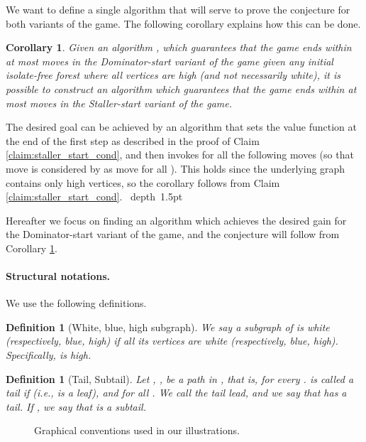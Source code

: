 \documentclass[11pt]{article}
\def\Proof{\par\noindent{\bf Proof:~}}
\def\blackslug{\hbox{\hskip 1pt \vrule width 4pt height 8pt
    depth 1.5pt \hskip 1pt}}
\def\QED{\quad\blackslug\lower 8.5pt\null\par}
\newtheorem{definition}[theorem]{Definition}
\newtheorem{corollary}[theorem]{Corollary}
\theoremstyle{definition}
\begin{document}
We want to define a single algorithm that will serve to prove the conjecture for both variants of the game.
The following corollary explains how this can be done.

\begin{corollary}
\label{cor:dom_stall_start}
Given an algorithm , which guarantees that the game ends within at most  moves in the Dominator-start variant of the game given any initial isolate-free forest where all vertices are high (and not necessarily white), it is possible to construct an algorithm  which guarantees that the game ends within at most  moves in the Staller-start variant of the game.
\end{corollary}
\Proof
The desired goal can be achieved by an algorithm  that sets the value function at the end of the first step as described in the proof of Claim \ref{claim:staller_start_cond}, and then invokes  for all the following moves (so that move  is considered by  as move  for all ).
This holds since the underlying graph  contains only high vertices, so the corollary follows from Claim \ref{claim:staller_start_cond}.
\QED

Hereafter we focus on finding an algorithm which achieves the desired gain for the Dominator-start variant of the game, and the conjecture will follow from Corollary \ref{cor:dom_stall_start}.


\paragraph{Structural notations.}
We use the following definitions.

\begin{definition}[White, blue, high subgraph]
We say a subgraph of  is white (respectively, blue, high) if all its vertices are white (respectively, blue, high).
Specifically,  is high.
\end{definition}

\begin{definition}[Tail, Subtail] 
Let , , be a path in ,
that is,  for every .
 is called a \emph{tail} if 
	 (i.e.,  is a leaf), and  for all .
We call  the \emph{tail lead}, and we say that  has a tail.
If , we say that  is a \emph{subtail}.
\end{definition}

\begin{figure}[thbp]
  \caption{\sf Graphical conventions used in our illustrations.}
  \medskip
  \centering
  \label{fig:notations}
\end{figure}
\end{document}
